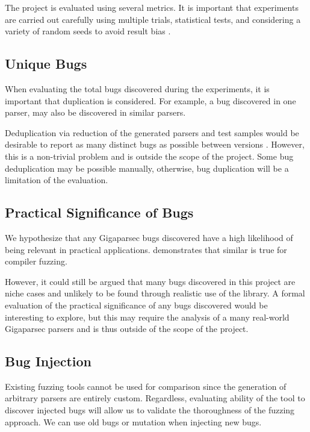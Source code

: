 \documentclass[11pt]{article}
\let\oldciteauthor\citeauthor
\renewcommand{\citeauthor}[1]{\oldciteauthor{#1} \cite{#1}}
\begin{document}
The project is evaluated using several metrics. It is important that experiments are carried out carefully using multiple trials, statistical tests, and considering a variety of random seeds to avoid result bias \cite{evaluation}.

\subsection{Unique Bugs}

When evaluating the total bugs discovered during the experiments, it is important that duplication is considered. For example, a bug discovered in one parser, may also be discovered in similar parsers.

Deduplication via reduction of the generated parsers and test samples would be desirable to report as many distinct bugs as possible between versions \cite{deduplication}. However, this is a non-trivial problem and is outside the scope of the project. Some bug deduplication may be possible manually, otherwise, bug duplication will be a limitation of the evaluation.

\subsection{Practical Significance of Bugs}

We hypothesize that any Gigaparsec bugs discovered have a high likelihood of being relevant in practical applications. \citeauthor{fuzzing-importance} demonstrates that similar is true for compiler fuzzing.

However, it could still be argued that many bugs discovered in this project are niche cases and unlikely to be found through realistic use of the library. A formal evaluation of the practical significance of any bugs discovered would be interesting to explore, but this may require the analysis of a many real-world Gigaparsec parsers and is thus outside of the scope of the project.

\subsection{Bug Injection}

Existing fuzzing tools cannot be used for comparison since the generation of arbitrary parsers are entirely custom. Regardless, evaluating ability of the tool to discover injected bugs will allow us to validate the thoroughness of the fuzzing approach. We can use old bugs or mutation when injecting new bugs.
\end{document}
